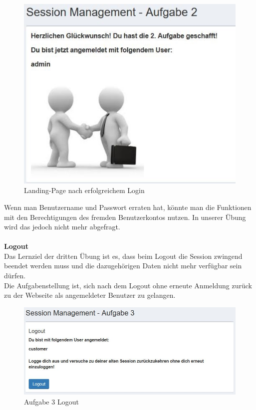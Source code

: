 \begin{figure}[H]
	\includegraphics[width=1.0\linewidth]{images/BrokenAuthenticationAndSessionManagement/Login_Ende}
	\caption[Login]{Landing-Page nach erfolgreichem Login}
	\label{fig:Aufgabe 2 Abschluss}
\end{figure} 
Wenn man Benutzername und Passwort erraten hat, könnte man  die Funktionen mit den Berechtigungen des fremden Benutzerkontos nutzen. In unserer Übung wird das jedoch nicht mehr abgefragt.\\\\
\textbf{Logout}\\
Das Lernziel der dritten Übung ist es, dass beim Logout die Session zwingend beendet werden muss und die dazugehörigen Daten nicht mehr verfügbar sein dürfen.\\
Die Aufgabenstellung ist, sich nach dem Logout ohne erneute Anmeldung zurück zu der Webseite als angemeldeter Benutzer zu gelangen.\\ 
\begin{figure}[H]
	\includegraphics[width=1.0\linewidth]{images/BrokenAuthenticationAndSessionManagement/Logout_Start}
	\caption[Logout]{Aufgabe 3 Logout}
	\label{fig:Aufgabe 3 Logout}
\end{figure}
